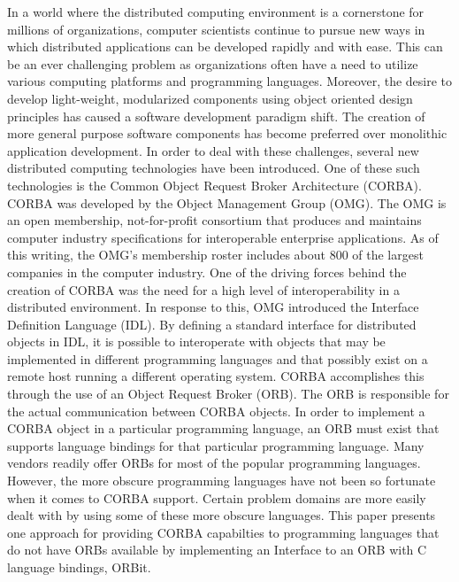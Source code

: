 
In a world where the distributed computing environment is a cornerstone 
for millions of organizations, computer scientists continue to pursue new 
ways in which distributed applications can be developed rapidly and with ease.
This can be an ever challenging problem as organizations often have a need to 
utilize various computing platforms and programming languages.  Moreover, the 
desire to develop light-weight, modularized components using object oriented 
design principles has caused a software development paradigm shift.  The 
creation of more general purpose software components has become preferred over 
monolithic application development. In order to deal with these challenges, 
several new distributed computing technologies have been introduced.  One of 
these such technologies is the Common Object Request Broker Architecture 
(CORBA).  CORBA was developed by the Object Management Group (OMG).  The OMG 
is an open membership, not-for-profit consortium that produces and maintains 
computer industry specifications for interoperable enterprise applications.    
As of this writing, the OMG's membership roster includes about 800 of the 
largest companies in the computer industry.  One of the driving forces behind 
the creation of CORBA was the need for a high level of interoperability in a 
distributed environment.  In response to this, OMG introduced the Interface 
Definition Language (IDL).  By defining a standard interface for distributed 
objects in IDL, it is possible to interoperate with objects that may be 
implemented in different programming languages and that possibly exist on a 
remote host running a different operating system.  CORBA accomplishes this 
through the use of an Object Request Broker (ORB). 
The ORB is responsible for the actual communication between CORBA objects.  
In order to implement a CORBA object in a particular programming language, 
an ORB must exist that supports language bindings for that particular 
programming language. 
Many vendors readily offer ORBs for most of the popular programming
languages.  However, the more obscure programming languages have not been 
so fortunate when it comes to CORBA support.  Certain problem domains are 
more easily dealt with by using some of these more obscure languages.
This paper presents one approach for providing CORBA capabilties to 
programming languages that do not have ORBs available by implementing 
an Interface to an ORB with C language bindings, ORBit.

